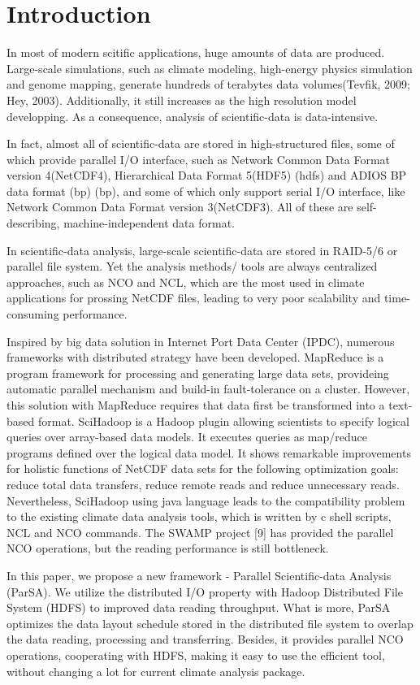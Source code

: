 \documentclass[preprint,12pt]{elsarticle}
\begin{document}
\linenumbers

\section{Introduction}
In most of modern scitific applications, huge amounts of data are produced. Large-scale simulations, such as climate modeling,
high-energy physics simulation and genome mapping, generate hundreds of terabytes data volumes(Tevfik, 2009; Hey, 2003). 
Additionally, it still increases as the high resolution model developping. As a consequence, analysis of scientific-data is 
data-intensive.\par
In fact, almost all of scientific-data are stored in high-structured files, some of which provide parallel I/O interface, such as
Network Common Data Format version 4(NetCDF4), Hierarchical Data Format 5(HDF5) (hdfs) and ADIOS BP data format (bp) (bp), and some
of which only support serial I/O interface,  like Network Common Data Format version 3(NetCDF3). All of these are self-describing,
machine-independent data format. \par
In scientific-data analysis, large-scale scientific-data are stored in RAID-5/6 or parallel file system. Yet the analysis methods/
tools are always centralized approaches, such as NCO and NCL, which are the most used in climate applications for prossing NetCDF
files, leading to very poor scalability and time-consuming performance. \par    
Inspired by big data solution in Internet Port Data Center (IPDC), numerous frameworks with distributed strategy have been developed.
MapReduce is a program framework for processing and generating large data sets, provideing automatic parallel mechanism and build-in
fault-tolerance on a cluster. However, this solution with MapReduce requires that data first be transformed into a text-based format.
SciHadoop is a Hadoop plugin allowing scientists to specify logical queries over array-based data models. It executes queries as
map/reduce programs defined over the logical data model. It shows remarkable improvements for holistic functions of NetCDF data sets
for the following optimization goals: reduce total data transfers, reduce remote reads and reduce unnecessary reads. Nevertheless,
SciHadoop using java language leads to the compatibility problem to the existing climate data analysis tools, which is written by c
shell scripts, NCL and NCO commands. The SWAMP project [9] has provided the parallel NCO operations, but the reading performance is
still bottleneck. \par
In this paper, we propose a new framework - Parallel Scientific-data Analysis (ParSA). We utilize the distributed I/O property with
Hadoop Distributed File System (HDFS) to improved data reading throughput. What is more, ParSA optimizes the data layout schedule
stored in the distributed file system to overlap the data reading, processing and transferring. Besides, it provides parallel NCO
operations, cooperating with HDFS, making it easy to use the efficient tool, without changing a lot for current climate analysis
package.
\end{document}
